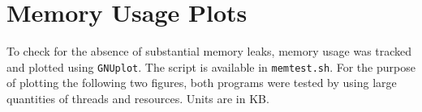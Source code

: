 \documentclass{article}
\begin{document}
    \section{Memory Usage Plots}
    To check for the absence of substantial memory leaks, memory usage was
    tracked and plotted using \texttt{GNUplot}. The script is available in
    \texttt{memtest.sh}. For the purpose of plotting the following two figures,
    both programs were tested by using large quantities of threads and resources.
    Units are in KB.
   
    \begin{figure}[htbp]
        \begin{center}
        
        \end{center}
    \end{figure}

    \begin{figure}[htbp]
        \begin{center}
        
        \end{center}
    \end{figure}
\end{document}
